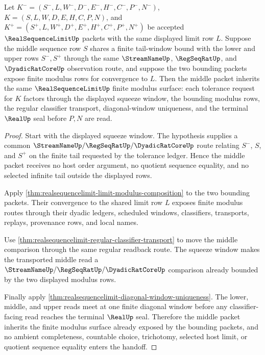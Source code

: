 \begin{theorem}\label{thm:squeeze-theorem-real-sequence-limit-handoff}
Let $K^-=(S^-,L,W^-,D^-,E^-,H^-,C^-,P^-,N^-)$, $K=(S,L,W,D,E,H,C,P,N)$, and $K^+=(S^+,L,W^+,D^+,E^+,H^+,C^+,P^+,N^+)$ be accepted $\RealSequenceLimitUp$ packets with the same displayed limit row $L$. Suppose the middle sequence row $S$ shares a finite tail-window bound with the lower and upper rows $S^-,S^+$ through the same $\StreamNameUp$, $\RegSeqRatUp$, and $\DyadicRatCoreUp$ observation route, and suppose the two bounding packets expose finite modulus rows for convergence to $L$. Then the middle packet inherits the same $\RealSequenceLimitUp$ finite modulus surface: each tolerance request for $K$ factors through the displayed squeeze window, the bounding modulus rows, the regular classifier transport, diagonal-window uniqueness, and the terminal $\RealUp$ seal before $P,N$ are read.
\end{theorem}
\begin{proof}
Start with the displayed squeeze window. The hypothesis supplies a common $\StreamNameUp/\RegSeqRatUp/\DyadicRatCoreUp$ route relating $S^-$, $S$, and $S^+$ on the finite tail requested by the tolerance ledger. Hence the middle packet receives no host order argument, no quotient sequence equality, and no selected infinite tail outside the displayed rows.

Apply \autoref{thm:realsequencelimit-limit-modulus-composition} to the two bounding packets. Their convergence to the shared limit row $L$ exposes finite modulus routes through their dyadic ledgers, scheduled windows, classifiers, transports, replays, provenance rows, and local names.

Use \autoref{thm:realsequencelimit-regular-classifier-transport} to move the middle comparison through the same regular readback route. The squeeze window makes the transported middle read a $\StreamNameUp/\RegSeqRatUp/\DyadicRatCoreUp$ comparison already bounded by the two displayed modulus rows.

Finally apply \autoref{thm:realsequencelimit-diagonal-window-uniqueness}. The lower, middle, and upper reads meet at one finite diagonal window before any classifier-facing read reaches the terminal $\RealUp$ seal. Therefore the middle packet inherits the finite modulus surface already exposed by the bounding packets, and no ambient completeness, countable choice, trichotomy, selected host limit, or quotient sequence equality enters the handoff.
\end{proof}


